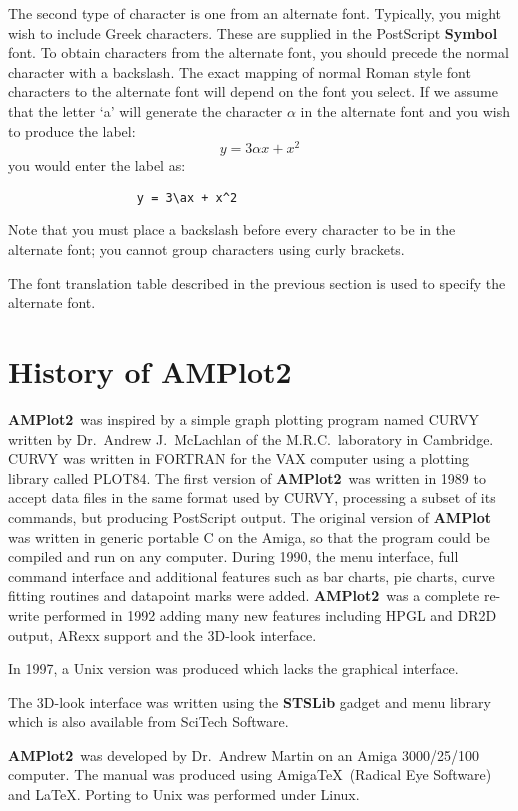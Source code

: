 \documentclass{report}
\newcommand{\amplot}{{\bf AMPlot2}}
\begin{document}
The second type of character is one from an alternate font. Typically, you might 
wish to include Greek characters. These are supplied 
in the PostScript {\bf Symbol} 
font. To obtain characters from the alternate font, you should precede  the normal 
character with a backslash. The exact mapping of normal Roman style font characters 
to the alternate font will depend on the font you select. If we assume that the 
letter `a' will generate the character $\alpha$ in the alternate font and you wish 
to produce the label:
$$ y = 3\alpha x + x^2 $$
you would enter the label as:
\begin{verbatim}
                  y = 3\ax + x^2
\end{verbatim}
Note that you must place a backslash before every character to be in the alternate 
font; you cannot group characters using curly brackets.

The font translation table described in the previous section is used to specify the 
alternate font.


\chapter{History of \amplot}
\amplot\ was inspired by a simple graph plotting program named CURVY written by 
Dr.\ Andrew J.\ McLachlan of the M.R.C.\ laboratory in Cambridge. CURVY was 
written in FORTRAN for the VAX computer using a plotting library called PLOT84.
The first version of \amplot\ was written in 1989 to accept data files in the 
same format used by CURVY, processing a subset of its commands, but producing 
PostScript output. The original version of {\bf AMPlot} was written in generic
portable C on the Amiga, so that the program could be compiled and run on any 
computer. During 1990, the menu interface, full command interface and additional 
features such as bar charts, pie charts, curve fitting routines and datapoint marks 
were added. \amplot\ was a complete re-write performed in 1992 adding many new 
features including HPGL and DR2D output, ARexx support and the 3D-look
interface.

In 1997, a Unix version was produced which lacks the graphical interface.

The 3D-look interface was written using the {\bf STSLib} gadget and menu library 
which is also available from {\sf SciTech Software}.

\amplot\ was developed by Dr.\ Andrew Martin on an Amiga 3000/25/100 computer.
The manual was produced using Amiga\TeX\ (Radical Eye Software) and
\LaTeX. Porting to Unix was performed under Linux.


\newpage

\end{document}
